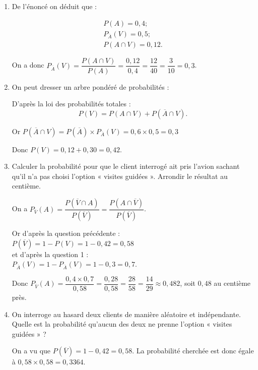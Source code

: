 \begin{enumerate}
	\item 	De l’énoncé on déduit que :
	
	\[
	\begin{array}{l}
		P(A) = 0,4; \\
		P_{\overline{A}}(V) = 0,5; \\
		P(A \cap V) = 0,12.
	\end{array}
	\]
	
	On a donc $P_{\overline{A}}(V) = \dfrac{P(A \cap V)}{P(A)} = \dfrac{0,12}{0,4} = \dfrac{12}{40} = \dfrac{3}{10} = 0,3$.
	
	\item
	On peut dresser un arbre pondéré de probabilités :\\
	
	D’après la loi des probabilités totales :
	\[
	P(V) = P(A \cap V) + P(\overline{A} \cap V).
	\]
	
	Or $P(\overline{A} \cap V) = P(\overline{A}) \times P_{\overline{A}}(V) = 0,6 \times 0,5 = 0,3$ 
	
	Donc $P(V) = 0,12 + 0,30 = 0,42$.
	
	\item
	Calculer la probabilité pour que le client interrogé ait pris l’avion sachant qu’il n’a pas choisi l’option « visites guidées ». Arrondir le résultat au centième.
	
	On a $P_{\overline{V}}(A) = \dfrac{P(\overline{V} \cap A)}{P(\overline{V})} = \dfrac{P(A \cap \overline{V})}{P(\overline{V})}$.
	
	Or d’après la question précédente : \\
	$P(\overline{V}) = 1 - P(V) = 1 - 0,42 = 0,58$\\
	 et d’après la question 1 :\\
	  $P_{\overline{A}}(V) = 1 - P_{\overline{A}}(V) = 1 - 0,3 = 0,7$.
	
	Donc $P_{\overline{V}}(A) = \dfrac{0,4 \times 0,7}{0,58} = \dfrac{0,28}{0,58} = \dfrac{28}{58} = \dfrac{14}{29} \approx 0,482$, soit $0,48$ au centième près.
	
	\item
	On interroge au hasard deux clients de manière aléatoire et indépendante. Quelle est la probabilité qu’aucun des deux ne prenne l’option « visites guidées » ?
	
	On a vu que $P(\overline{V}) = 1 - 0,42 = 0,58$. La probabilité cherchée est donc égale à $0,58 \times 0,58 = 0,3364$.
\end{enumerate}
